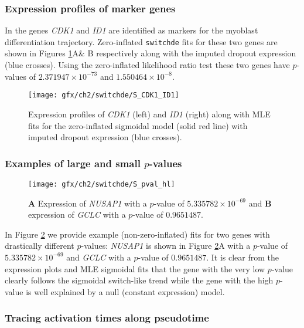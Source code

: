 \subsubsection{Expression profiles of marker genes}

In \cite{Trapnell2014-xi} the genes \emph{CDK1} and \emph{ID1} are identified as markers for the myoblast differentiation trajectory. Zero-inflated \texttt{switchde} fits for these two genes are shown in Figures \ref{fig:S1}A\& B respectively along with the imputed dropout expression (blue crosses). Using the zero-inflated likelihood ratio test these two genes have $p$-values of $2.371947 \times 10^{-73}$ and $1.550464 \times 10^{-8}$.

\begin{figure}[h]
\centering
\texttt{[image: gfx/ch2/switchde/S\_CDK1\_ID1]}
\caption[Expression profiles of MLE fits.]{Expression profiles of \emph{CDK1} (left) and \emph{ID1} (right) along with MLE fits for the zero-inflated sigmoidal model (solid red line) with imputed dropout expression (blue crosses).}\label{fig:S1}
\end{figure}

\subsubsection{Examples of large and small $p$-values}

\begin{figure}[h]%
\centering
\texttt{[image: gfx/ch2/switchde/S\_pval\_hl]}
\caption[Sigmoidal expression of example genes.]{\textbf{A} Expression of \emph{NUSAP1} with a $p$-value of $5.335782 \times 10^{-69}$ and \textbf{B} expression of \emph{GCLC} with a $p$-value of $0.9651487$.}\label{fig:S2}
\end{figure}

In Figure \ref{fig:S2} we provide example (non-zero-inflated) fits for two genes with drastically different $p$-values: \emph{NUSAP1} is shown in Figure \ref{fig:S2}A with a $p$-value of $5.335782 \times 10^{-69}$ and \emph{GCLC} with a $p$-value of $0.9651487$. It is clear from the expression plots and MLE sigmoidal fits that the gene with the very low $p$-value clearly follows the sigmoidal switch-like trend while the gene with the high $p$-value is well explained by a null (constant expression) model.

\subsubsection{Tracing activation times along pseudotime}


